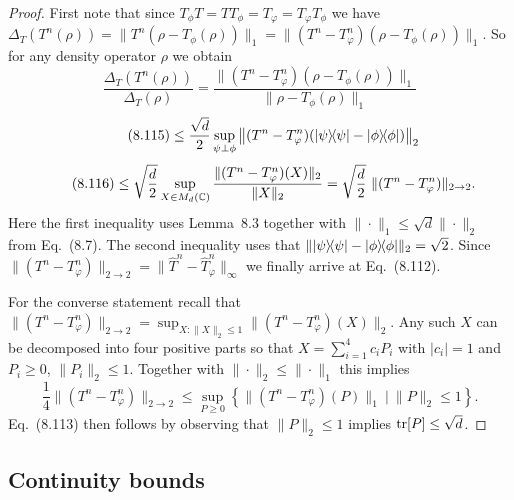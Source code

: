 \documentclass[11pt,a4paper]{article}
\theoremstyle{plain}
\theoremstyle{definition}
\theoremstyle{remark}
\begin{document}
\begin{proof}
    First note that since $T_\phi T = TT_\phi = T_\varphi = T_\varphi T_\phi$ we have
    $\Delta_T(T^n(\rho)) = \|T^n(\rho-T_\phi(\rho))\|_1 = \|(T^n-T_\varphi^n)(\rho-T_\phi(\rho))\|_1$.
    So for any density operator $\rho$ we obtain
    \begin{equation}\tag{8.114}
        \frac{\Delta_T(T^n(\rho))}{\Delta_T(\rho)}
        =
        \frac{\|(T^n-T_\varphi^n)(\rho-T_\phi(\rho))\|_1}{\|\rho-T_\phi(\rho)\|_1}
    \end{equation}
    \begin{equation}\tag{8.115}
        \le \frac{\sqrt{d}}{2}\sup_{\psi\perp\phi}\left\|(T^n-T_\varphi^n)\!\left(|\psi\rangle\!\langle\psi|-|\phi\rangle\!\langle\phi|\right)\right\|_2
    \end{equation}
    \begin{equation}\tag{8.116}
        \le \sqrt{\frac{d}{2}}\sup_{X\in M_d(\mathbb{C})} \frac{\|(T^n-T_\varphi^n)(X)\|_2}{\|X\|_2}
        = \sqrt{\frac{d}{2}}\ \|(T^n-T_\varphi^n)\|_{2\to 2}.
    \end{equation}
    Here the first inequality uses Lemma~8.3 together with $\|\cdot\|_1\le \sqrt{d}\|\cdot\|_2$ from Eq.~(8.7). The second inequality uses that
    $\||\psi\rangle\!\langle\psi|-|\phi\rangle\!\langle\phi|\|_2=\sqrt{2}$. Since $\|(T^n-T_\varphi^n)\|_{2\to2}=\|\hat{T}^n-\hat{T}_\varphi^n\|_\infty$ we finally arrive at
    Eq.~(8.112).

    For the converse statement recall that $\|(T^n-T_\varphi^n)\|_{2\to2} = \sup_{X:\|X\|_2\le 1}\|(T^n-T_\varphi^n)(X)\|_2$.
    Any such $X$ can be decomposed into four positive parts so that $X=\sum_{i=1}^4 c_i P_i$ with $|c_i|=1$ and $P_i\ge 0$, $\|P_i\|_2\le 1$.
    Together with $\|\cdot\|_2\le \|\cdot\|_1$ this implies
    \begin{equation}\tag{8.117}
        \frac{1}{4}\|(T^n-T_\varphi^n)\|_{2\to2}
        \le \sup_{P\ge 0}\left\{\|(T^n-T_\varphi^n)(P)\|_1\ \big|\ \|P\|_2\le 1\right\}.
    \end{equation}
    Eq.~(8.113) then follows by observing that $\|P\|_2\le 1$ implies $\operatorname{tr}[P]\le \sqrt{d}$.
\end{proof}

\subsection{Continuity bounds}

\end{document}
